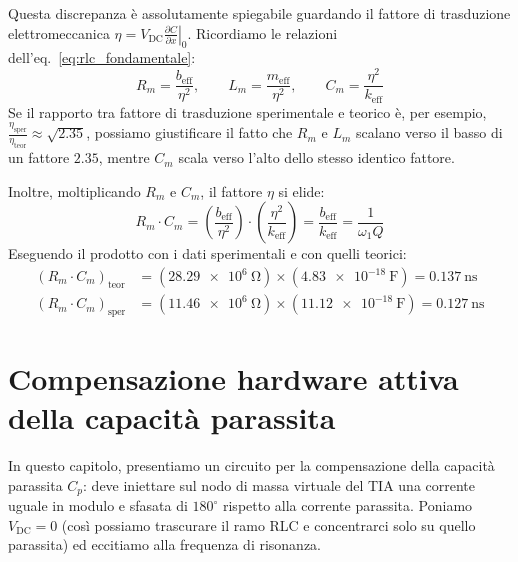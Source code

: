 \documentclass[11pt,a4paper]{article}
\begin{document}
\noindent Questa discrepanza è assolutamente spiegabile guardando il fattore di trasduzione elettromeccanica $\eta = V_{\text{DC}} \left.\frac{\partial C}{\partial x}\right|_0$. Ricordiamo le relazioni dell'eq.~\eqref{eq:rlc_fondamentale}:
    \begin{equation}
        R_m = \frac{b_{\text{eff}}}{\eta^2}, \qquad L_m = \frac{m_{\text{eff}}}{\eta^2}, \qquad C_m = \frac{\eta^2}{k_{\text{eff}}}
    \end{equation}
Se il rapporto tra fattore di trasduzione sperimentale e teorico è, per esempio, $\frac{\eta_{\text{sper}}}{\eta_{\text{teor}}} \approx \sqrt{2.35}$, possiamo giustificare il fatto che $R_m$ e $L_m$ scalano verso il basso di un fattore $2.35$, mentre $C_m$ scala verso l'alto dello stesso identico fattore.

\noindent Inoltre, moltiplicando $R_m$ e $C_m$, il fattore $\eta$ si elide:
    \begin{equation}
        R_m \cdot C_m = \left( \frac{b_{\text{eff}}}{\eta^2} \right) \cdot \left( \frac{\eta^2}{k_{\text{eff}}} \right) = \frac{b_{\text{eff}}}{k_{\text{eff}}} = \frac{1}{\omega_1 Q}
    \end{equation}
Eseguendo il prodotto con i dati sperimentali e con quelli teorici:
    \begin{align}
        (R_m \cdot C_m)_{\text{teor}} &= (\SI{28.29e6}{\ohm}) \times (\SI{4.83e-18}{\farad}) = \SI{0.137}{\nano\second} \\
        (R_m \cdot C_m)_{\text{sper}} &= (\SI{11.46e6}{\ohm}) \times (\SI{11.12e-18}{\farad}) = \SI{0.127}{\nano\second}
    \end{align}


\newpage
\section{Compensazione hardware attiva della capacità parassita}
\label{sec:compensazione_hardware}

In questo capitolo, presentiamo un circuito per la compensazione della capacità parassita $C_p$: deve iniettare sul nodo di massa virtuale del TIA una corrente uguale in modulo e sfasata di $180^\circ$ rispetto alla corrente parassita. Poniamo $V_{\text{DC}}=0$ (così possiamo trascurare il ramo RLC e concentrarci solo su quello parassita) ed eccitiamo alla frequenza di risonanza.
\end{document}
